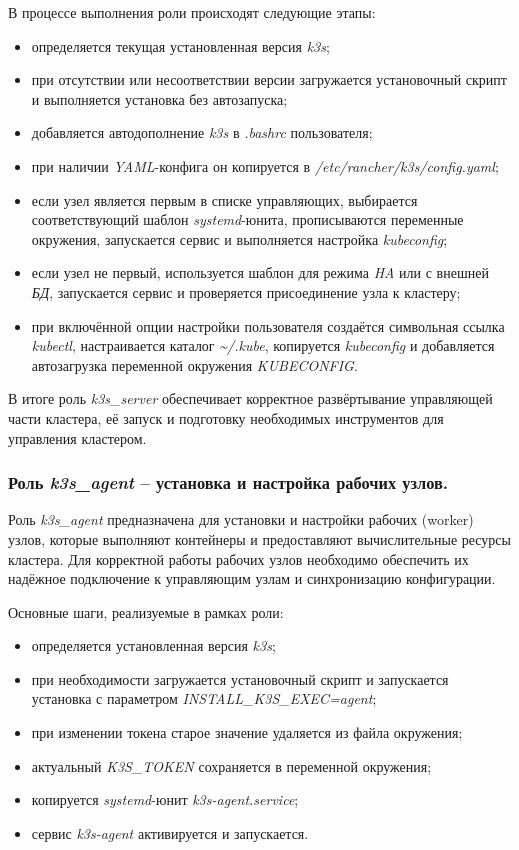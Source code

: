 В процессе выполнения роли происходят следующие этапы:
\begin{itemize}
  \item определяется текущая установленная версия \textit{k3s};
  \item при отсутствии или несоответствии версии загружается установочный скрипт и выполняется установка без автозапуска;
  \item добавляется автодополнение \textit{k3s} в \textit{.bashrc} пользователя;
  \item при наличии \textit{YAML}-конфига он копируется в \textit{/etc/rancher/k3s/config.yaml};
  \item если узел является первым в списке управляющих, выбирается соответствующий шаблон \textit{systemd}-юнита, прописываются переменные окружения, запускается сервис и выполняется настройка \textit{kubeconfig};
  \item если узел не первый, используется шаблон для режима \textit{HA} или с внешней \textit{БД}, запускается сервис и проверяется присоединение узла к кластеру;
  \item при включённой опции настройки пользователя создаётся символьная ссылка \textit{kubectl}, настраивается каталог \textit{\textasciitilde/.kube}, копируется \textit{kubeconfig} и добавляется автозагрузка переменной окружения \textit{KUBECONFIG}.
\end{itemize}

В итоге роль \textit{k3s\_server} обеспечивает корректное развёртывание управляющей части кластера, её запуск и подготовку необходимых инструментов для управления кластером.

\subsubsection{Роль \textit{k3s\_agent} -- установка и настройка рабочих узлов.}
Роль \textit{k3s\_agent} предназначена для установки и настройки рабочих (worker) узлов, которые выполняют контейнеры и предоставляют вычислительные ресурсы кластера. Для корректной работы рабочих узлов необходимо обеспечить их надёжное подключение к управляющим узлам и синхронизацию конфигурации.

Основные шаги, реализуемые в рамках роли:
\begin{itemize}
  \item определяется установленная версия \textit{k3s};
  \item при необходимости загружается установочный скрипт и запускается установка с параметром \textit{INSTALL\_K3S\_EXEC=agent};
  \item при изменении токена старое значение удаляется из файла окружения;
  \item актуальный \textit{K3S\_TOKEN} сохраняется в переменной окружения;
  \item копируется \textit{systemd}-юнит \textit{k3s-agent.service};
  \item сервис \textit{k3s-agent} активируется и запускается.
\end{itemize}

